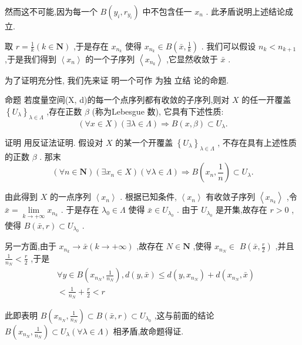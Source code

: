 然而这不可能,因为每一个 $B\left( {{y}_{i},{r}_{{y}_{i}}}\right)$ 中不包含任一 ${x}_{n}$ . 此矛盾说明上述结论成立.

取 $r = \frac{1}{k}\left( {k \in  \mathbf{N}}\right)$ ,于是存在 ${x}_{{n}_{k}}$ 使得 ${x}_{{n}_{k}} \in  B\left( {\bar{x},\frac{1}{k}}\right)$ . 我们可以假设 ${n}_{k} < {n}_{k + 1}$ ,于是我们得到 $\left\langle  {x}_{n}\right\rangle$ 的一个子序列 $\left\langle  {x}_{{n}_{k}}\right\rangle$ ,它显然收敛于 $\bar{x}$ .

为了证明充分性, 我们先来证 明一个可作 为独 立结 论的命题.

命题 若度量空间(X, d)的每一个点序列都有收敛的子序列,则对 $X$ 的任一开覆盖 ${\left\{  {U}_{\lambda }\right\}  }_{\lambda  \in  \Lambda }$ ,存在正数 $\beta$ (称为Lebesgue 数), 它具有下述性质:
$$\left( {\forall x \in  X}\right) \left( {\exists \lambda  \in  \Lambda }\right)  \Rightarrow  B\left( {x,\beta }\right)  \subset  {U}_{\lambda }.$$

证明 用反证法证明. 假设对 $X$ 的某一个开覆盖 ${\left\{  {U}_{\lambda }\right\}  }_{\lambda  \in  \Lambda }$ , 不存在具有上述性质的正数 $\beta$ . 那末
$$\left( {\forall n \in  \mathbf{N}}\right) \left( {\exists {x}_{n} \in  X}\right) \left( {\forall \lambda  \in  \Lambda }\right)  \Rightarrow  B\left( {{x}_{n},\frac{1}{n}}\right)  \subset  {U}_{\lambda }.$$

由此得到 $X$ 的一点序列 $\left\langle  {x}_{n}\right\rangle$ . 根据已知条件, $\left\langle  {x}_{n}\right\rangle$ 有收敛子序列 $\left\langle  {x}_{{n}_{k}}\right\rangle$ ,令 $\bar{x} = \mathop{\lim }\limits_{{k \rightarrow   + \infty }}{x}_{{n}_{k}}$ . 于是存在 ${\lambda }_{0} \in  \Lambda$ 使得 $\bar{x} \in  {U}_{{\lambda }_{0}}$ . 由于 ${U}_{{\lambda }_{0}}$ 是开集,故存在 $r > 0$ ,使得 $B\left( {\bar{x},r}\right)  \subset  {U}_{{\lambda }_{0}}$ .

另一方面,由于 ${x}_{{n}_{k}} \rightarrow  \bar{x}\left( {k \rightarrow   + \infty }\right)$ ,故存在 $N \in  \mathbf{N}$ ,使得 ${x}_{{n}_{N}} \in$  $B\left( {\bar{x},\frac{r}{2}}\right)$ ,并且 $\frac{1}{{n}_{N}} < \frac{r}{2}$ ,于是
\begin{align*}
	&\forall y \in  B\left( {{x}_{{n}_{N}},\frac{1}{{n}_{N}}}\right) ,d\left( {y,\bar{x}}\right)  \leq  d\left( {y,{x}_{{n}_{N}}}\right)  + d\left( {{x}_{{n}_{N}},\bar{x}}\right)\\
	&< \frac{1}{{n}_{N}} + \frac{r}{2} < r
\end{align*}

此即表明 $B\left( {{x}_{{n}_{N}},\frac{1}{{n}_{N}}}\right)  \subset  B\left( {\bar{x},r}\right)  \subset  {U}_{{\lambda }_{0}}$ ,这与前面的结论 $B\left( {{x}_{{n}_{N}},\frac{1}{{n}_{N}}}\right)  \subset  {U}_{\lambda }\left( {\forall \lambda  \in  \Lambda }\right)$ 相矛盾,故命题得证.

